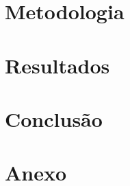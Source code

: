 \documentclass[12pt, a4paper, twoside]{article}
\numberwithin{equation}{subsection} %
\begin{document}
\tableofcontents
\newpage




% 


% 

\section{\textbf{Metodologia}}

\newpage

\section{\textbf{Resultados}}

\newpage

% 

\section{\textbf{Conclusão}}
\newpage




\section{\textbf{Anexo}}
\newpage
\end{document}
